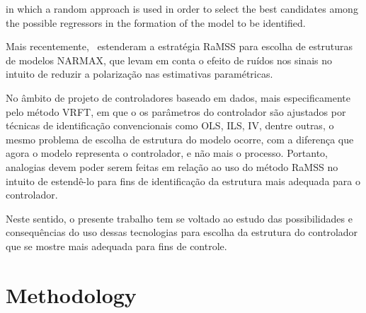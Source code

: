in which a random approach is used in order to select the best candidates among the possible regressors in the formation of the model to be identified.


Mais recentemente,~\cite{retesNARMAXModelIdentification2019} estenderam a estratégia RaMSS para escolha de estruturas de modelos NARMAX, que levam em conta o efeito de ruídos nos sinais no intuito de reduzir a polarização nas estimativas paramétricas. 

No âmbito de projeto de controladores baseado em dados, mais especificamente pelo método VRFT, em que o os parâmetros do controlador são ajustados por técnicas de identificação convencionais como OLS, ILS, IV, dentre outras, o mesmo problema de escolha de estrutura do modelo ocorre, com a diferença que agora o modelo representa o controlador, e não mais o processo. Portanto, analogias devem poder serem feitas em relação ao uso do método RaMSS no intuito de estendê-lo para fins de identificação da estrutura mais adequada para o controlador.

Neste sentido, o presente trabalho tem se voltado ao estudo das possibilidades e consequências do uso dessas tecnologias para escolha da estrutura do controlador que se mostre mais adequada para fins de controle. 


\section{Methodology}\label{sec:CSS_metod}

